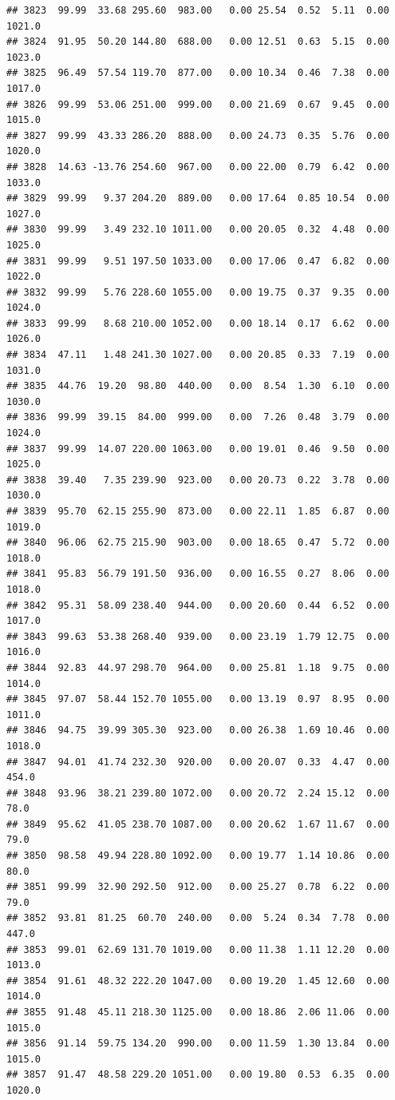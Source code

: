\documentclass{article}\usepackage{graphicx, color}
\makeatletter
\newenvironment{kframe}{%
 \def\at@end@of@kframe{}%
 \ifinner\ifhmode%
  \def\at@end@of@kframe{\end{minipage}}%
  \begin{minipage}{\columnwidth}%
 \fi\fi%
 \def\FrameCommand##1{\hskip\@totalleftmargin \hskip-\fboxsep
 \colorbox{shadecolor}{##1}\hskip-\fboxsep
     \hskip-\linewidth \hskip-\@totalleftmargin \hskip\columnwidth}%
 \MakeFramed {\advance\hsize-\width
   \@totalleftmargin\z@ \linewidth\hsize
   \@setminipage}}%
 {\par\unskip\endMakeFramed%
 \at@end@of@kframe}
\newenvironment{knitrout}{}{} %
\makeatother
\begin{document}
\begin{knitrout}
\begin{kframe}
\begin{verbatim}
## 3823  99.99  33.68 295.60  983.00   0.00 25.54  0.52  5.11  0.00 1021.0
## 3824  91.95  50.20 144.80  688.00   0.00 12.51  0.63  5.15  0.00 1023.0
## 3825  96.49  57.54 119.70  877.00   0.00 10.34  0.46  7.38  0.00 1017.0
## 3826  99.99  53.06 251.00  999.00   0.00 21.69  0.67  9.45  0.00 1015.0
## 3827  99.99  43.33 286.20  888.00   0.00 24.73  0.35  5.76  0.00 1020.0
## 3828  14.63 -13.76 254.60  967.00   0.00 22.00  0.79  6.42  0.00 1033.0
## 3829  99.99   9.37 204.20  889.00   0.00 17.64  0.85 10.54  0.00 1027.0
## 3830  99.99   3.49 232.10 1011.00   0.00 20.05  0.32  4.48  0.00 1025.0
## 3831  99.99   9.51 197.50 1033.00   0.00 17.06  0.47  6.82  0.00 1022.0
## 3832  99.99   5.76 228.60 1055.00   0.00 19.75  0.37  9.35  0.00 1024.0
## 3833  99.99   8.68 210.00 1052.00   0.00 18.14  0.17  6.62  0.00 1026.0
## 3834  47.11   1.48 241.30 1027.00   0.00 20.85  0.33  7.19  0.00 1031.0
## 3835  44.76  19.20  98.80  440.00   0.00  8.54  1.30  6.10  0.00 1030.0
## 3836  99.99  39.15  84.00  999.00   0.00  7.26  0.48  3.79  0.00 1024.0
## 3837  99.99  14.07 220.00 1063.00   0.00 19.01  0.46  9.50  0.00 1025.0
## 3838  39.40   7.35 239.90  923.00   0.00 20.73  0.22  3.78  0.00 1030.0
## 3839  95.70  62.15 255.90  873.00   0.00 22.11  1.85  6.87  0.00 1019.0
## 3840  96.06  62.75 215.90  903.00   0.00 18.65  0.47  5.72  0.00 1018.0
## 3841  95.83  56.79 191.50  936.00   0.00 16.55  0.27  8.06  0.00 1018.0
## 3842  95.31  58.09 238.40  944.00   0.00 20.60  0.44  6.52  0.00 1017.0
## 3843  99.63  53.38 268.40  939.00   0.00 23.19  1.79 12.75  0.00 1016.0
## 3844  92.83  44.97 298.70  964.00   0.00 25.81  1.18  9.75  0.00 1014.0
## 3845  97.07  58.44 152.70 1055.00   0.00 13.19  0.97  8.95  0.00 1011.0
## 3846  94.75  39.99 305.30  923.00   0.00 26.38  1.69 10.46  0.00 1018.0
## 3847  94.01  41.74 232.30  920.00   0.00 20.07  0.33  4.47  0.00  454.0
## 3848  93.96  38.21 239.80 1072.00   0.00 20.72  2.24 15.12  0.00   78.0
## 3849  95.62  41.05 238.70 1087.00   0.00 20.62  1.67 11.67  0.00   79.0
## 3850  98.58  49.94 228.80 1092.00   0.00 19.77  1.14 10.86  0.00   80.0
## 3851  99.99  32.90 292.50  912.00   0.00 25.27  0.78  6.22  0.00   79.0
## 3852  93.81  81.25  60.70  240.00   0.00  5.24  0.34  7.78  0.00  447.0
## 3853  99.01  62.69 131.70 1019.00   0.00 11.38  1.11 12.20  0.00 1013.0
## 3854  91.61  48.32 222.20 1047.00   0.00 19.20  1.45 12.60  0.00 1014.0
## 3855  91.48  45.11 218.30 1125.00   0.00 18.86  2.06 11.06  0.00 1015.0
## 3856  91.14  59.75 134.20  990.00   0.00 11.59  1.30 13.84  0.00 1015.0
## 3857  91.47  48.58 229.20 1051.00   0.00 19.80  0.53  6.35  0.00 1020.0

\end{verbatim}
\end{kframe}
\end{knitrout}
\end{document}
